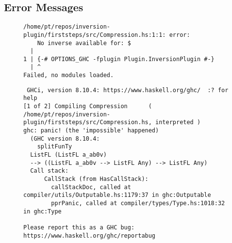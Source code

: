 \newpage

\subsection{Error Messages}
\label{A:error}

\begin{figure}[h]
\begin{verbatim}
/home/pt/repos/inversion-plugin/firststeps/src/Compression.hs:1:1: error:
    No inverse available for: $
  |
1 | {-# OPTIONS_GHC -fplugin Plugin.InversionPlugin #-}
  | ^
Failed, no modules loaded.
\end{verbatim}
\end{figure}

\begin{figure}[h]
\begin{verbatim}
 GHCi, version 8.10.4: https://www.haskell.org/ghc/  :? for help
[1 of 2] Compiling Compression      ( /home/pt/repos/inversion-plugin/firststeps/src/Compression.hs, interpreted )
ghc: panic! (the 'impossible' happened)
  (GHC version 8.10.4:
	splitFunTy
  ListFL (ListFL a_ab0v)
  --> ((ListFL a_ab0v --> ListFL Any) --> ListFL Any)
  Call stack:
      CallStack (from HasCallStack):
        callStackDoc, called at compiler/utils/Outputable.hs:1179:37 in ghc:Outputable
        pprPanic, called at compiler/types/Type.hs:1018:32 in ghc:Type

Please report this as a GHC bug:  https://www.haskell.org/ghc/reportabug
\end{verbatim}
\end{figure}
